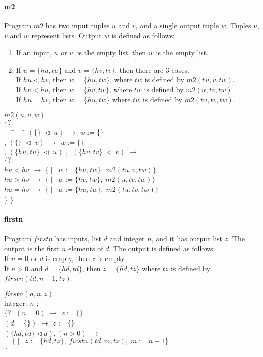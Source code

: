 \paragraph{m2}
Program $m2$ has two input tuples $u$ and $v$, and a single output
tuple $w$. 
Tuples $u$, $v$ and $w$ represent lists. 
Output $w$ is defined as follows:
\begin{enumerate}
   \item If an input, $u$ or $v$, is the empty list, then $w$ is the empty list.
   \item If $u = \{ hu , tu \}$ and $v = \{ hv , tv \}$, then
         there are 3 cases: \\
         If $hu < hv$, then $w = \{hu, tw\}$, 
         where $tw$ is defined by $m2(tu,v,tw)$.\\
         If $hv < hu$, then $w = \{hv, tw\}$, 
         where $tw$ is defined by $m2(u,tv,tw)$. \\
         If $hu = hv$, then $w = \{hu, tw\}$ 
         where $tw$ is defined by $m2(tu,tv,tw)$.
\end{enumerate}
\begin{tabbing}
$m2(u,v,w)$ \\
$\{?$ \\
$\; \; \; \;$ \= $\; \; \;$ \= 
$(\{\} \; \lhd \; u)$ $\rightarrow$ $w := \{\}$ \\
\> , \> $(\{\} \; \lhd \; v)$ $\rightarrow$ $w := \{\}$ \\
,\> $(\{ hu , tu \} \; \lhd \; u)$ , \=
$(\{ hv , tv \} \; \lhd \; v)$ $\rightarrow$ \\
\> $\{?$ \= \\
\> \> $hu < hv$ $\rightarrow$ $\{\| \; w := \{hu, tw\}, \; m2(tu,v,tw)\}$ \\
\> \> $hu > hv$ $\rightarrow$ $\{\| \; w := \{hv, tw\}, \; m2(u,tv,tw)\}$ \\
\> \> $hu = hv$ $\rightarrow$ $\{\| \; w := \{hu, tw\}, \; m2(tu,tv,tw)\}$ \\
\> $\}$
$\}$ 
\end{tabbing}

\paragraph{firstn}
Program $firstn$ has inputs, list $d$ and integer $n$, 
and it has output list $z$.
The output is the first $n$ elements of $d$.
The output is defined as follows:\\
If $n=0$ or $d$ is empty, then $z$ is empty. \\
If $n > 0$ and $d = \{hd,td\}$, then $z = \{hd,tz\}$ where $tz$ is
defined by $firstn(td,n-1,tz)$.
\begin{tabbing}
$firstn(d,n,z)$ \\
integer: $n$ ; \\
$\{?$ \= $(n = 0)$  $\rightarrow$ $z := \{\}$ \\
      \> $(d = \{\})$ $\rightarrow$ $z := \{\}$ \\
      \> $(\{hd,td\} \lhd d),(n>0)$ $\rightarrow$ \\
      \>$\;\;\; \;\{\|\; z := \{hd,tz\}, \; firstn(td,m,tz), \; m := n-1 \}$ \\
$\}$
\end{tabbing}

